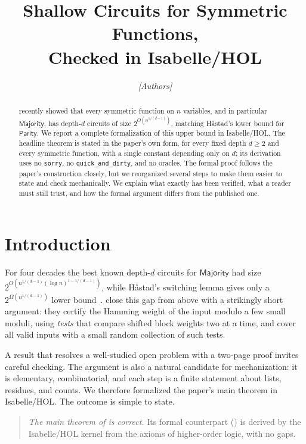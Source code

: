 \documentclass[11pt]{article}
\title{Shallow Circuits for Symmetric Functions,\\ Checked in Isabelle/HOL}
\author{%
\textit{[Authors]}%
}
\newcommand{\isa}[1]{\texttt{#1}}
\newcommand{\Majority}{\mathsf{Majority}}
\newcommand{\Parity}{\mathsf{Parity}}
\begin{document}
\maketitle

\begin{abstract}
\citet{LR26} recently showed that every symmetric function on $n$ variables, and in particular $\Majority$, has depth-$d$ circuits of size $2^{O(n^{1/(d-1)})}$, matching H{\aa}stad's lower bound for $\Parity$.
We report a complete formalization of this upper bound in Isabelle/HOL. The headline theorem is stated in the paper's own form, for every fixed depth $d \ge 2$ and every symmetric function, with a single constant depending only on $d$; its derivation uses no \isa{sorry}, no \isa{quick\_and\_dirty}, and no oracles.
The formal proof follows the paper's construction closely, but we reorganized several steps to make them easier to state and check mechanically. We explain what exactly has been verified, what a reader must still trust, and how the formal argument differs from the published one.
\end{abstract}

\section{Introduction}

For four decades the best known depth-$d$ circuits for $\Majority$ had size $2^{O(n^{1/(d-1)}(\log n)^{1-1/(d-1)})}$, while H{\aa}stad's switching lemma gives only a $2^{\Omega(n^{1/(d-1)})}$ lower bound~\citep{Has86}. \citet{LR26} close this gap from above with a strikingly short argument: they certify the Hamming weight of the input modulo a few small moduli, using \emph{tests} that compare shifted block weights two at a time, and cover all valid inputs with a small random collection of such tests.

A result that resolves a well-studied open problem with a two-page proof invites careful checking. The argument is also a natural candidate for mechanization: it is elementary, combinatorial, and each step is a finite statement about lists, residues, and counts. We therefore formalized the paper's main theorem in Isabelle/HOL. The outcome is simple to state.

\begin{quote}
\emph{The main theorem of \citet{LR26} is correct.} Its formal counterpart () is derived by the Isabelle/HOL kernel from the axioms of higher-order logic, with no gaps.
\end{quote}
\end{document}

